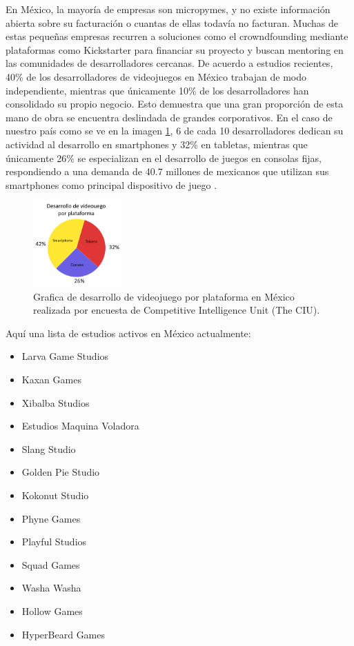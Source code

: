 En México, la mayoría de empresas son micropymes, y no existe información abierta sobre su facturación o cuantas de ellas todavía no facturan. Muchas de estas pequeñas empresas recurren a soluciones como el crowndfounding mediante plataformas como Kickstarter para financiar su proyecto y buscan mentoring en las comunidades de desarrolladores cercanas\cite{vid05}. De acuerdo a estudios recientes, 40\% de los desarrolladores de videojuegos en México trabajan de modo independiente, mientras que únicamente 10\% de los desarrolladores han consolidado su propio negocio. Esto demuestra que una gran proporción de esta mano de obra se encuentra deslindada de grandes corporativos. En el caso de nuestro país como se ve en la imagen \ref{fig:desVj}, 6 de cada 10 desarrolladores dedican su actividad al desarrollo en smartphones y 32\% en tabletas, mientras que únicamente 26\% se especializan en el desarrollo de juegos en consolas fijas, respondiendo a una demanda de 40.7 millones de mexicanos que utilizan sus smartphones como principal dispositivo de juego \cite{vid04}.
\\[1pt]
\begin{figure}
	\centering
	\includegraphics[width=0.3\textwidth]{03MarcoTeorico/imageR/desVj.png}
	\caption{Grafica de desarrollo de videojuego por plataforma en México realizada por encuesta de Competitive Intelligence Unit (The CIU).}
	\label{fig:desVj}
\end{figure}

Aquí una lista de estudios activos en México actualmente:
\begin{itemize}
	\item Larva Game Studios
	\item Kaxan Games
	\item Xibalba Studios
	\item Estudios Maquina Voladora
	\item Slang Studio
	\item Golden Pie Studio
	\item Kokonut Studio
	\item Phyne Games
	\item Playful Studios
	\item Squad Games
	\item Washa Washa
	\item Hollow Games
	\item HyperBeard Games
	
\end{itemize}
